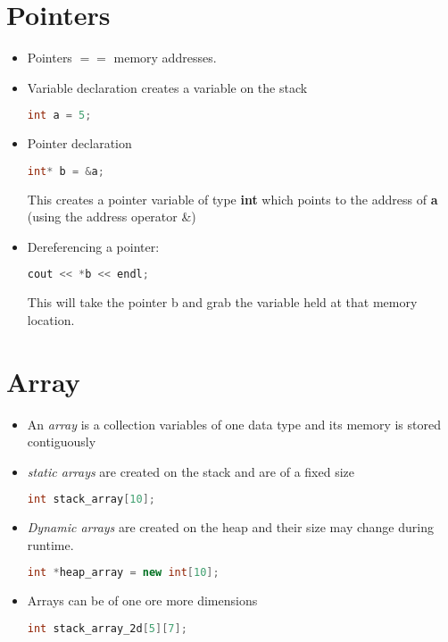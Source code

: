 \documentclass[a4paper, 11pt]{article}
\begin{document}
\section*{Pointers}
\begin{itemize}
\item Pointers $==$ memory addresses.
  
\item Variable declaration creates a variable on the stack

\begin{lstlisting}[language=C++]
int a = 5;
\end{lstlisting}
  
\item Pointer declaration
  
\begin{lstlisting}[language=C++]
int* b = &a; 
\end{lstlisting}
This creates a pointer variable of type \textbf{int} which points to the address
of \textbf{a} (using the address operator \&)

\item Dereferencing a pointer:
  
\begin{lstlisting}[language=C++]
cout << *b << endl; 
\end{lstlisting}
This will take the pointer b and grab the variable held at that memory location. 

\end{itemize}



\section*{Array}
\begin{itemize}
  \item An \textit{array} is a collection variables of one data type and its
    memory is stored contiguously

  \item \textit{static arrays} are created on the stack and are of a fixed size

\begin{lstlisting}[language=C++]
int stack_array[10]; 
\end{lstlisting}
    
  \item \textit{Dynamic arrays} are created on the heap and their size may
    change during runtime.

    
\begin{lstlisting}[language=C++]
int *heap_array = new int[10]; 
\end{lstlisting}

  \item Arrays can be of one ore more dimensions

    
\begin{lstlisting}[language=C++]
int stack_array_2d[5][7]; 
\end{lstlisting}
\end{itemize}
\end{document}
